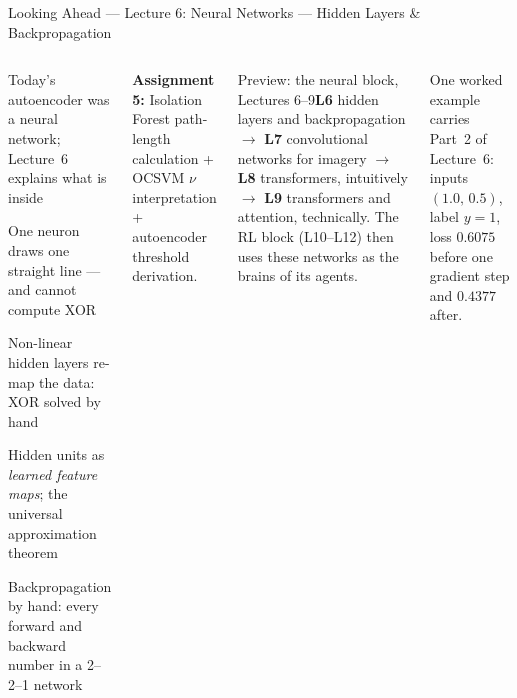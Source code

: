 \documentclass[aspectratio=169,10pt,t]{beamer}
\begin{document}
\begin{frame}{Looking Ahead --- Lecture 6: Neural Networks --- Hidden Layers \& Backpropagation}
\begin{columns}[T]
\begin{tl}\item Today's autoencoder was a neural network; Lecture~6 explains what is inside\item One neuron draws one straight line --- and cannot compute XOR\item Non-linear hidden layers re-map the data: XOR solved by hand\item Hidden units as \emph{learned feature maps}; the universal approximation theorem\item Backpropagation by hand: every forward and backward number in a 2--2--1 network\end{tl}
\begin{ibox}\scriptsize\textbf{Assignment 5:} Isolation Forest path-length calculation + OCSVM $\nu$ interpretation + autoencoder threshold derivation.\end{ibox}
\begin{cbox}{Preview: the neural block, Lectures 6--9}\scriptsize \textbf{L6} hidden layers and backpropagation $\to$ \textbf{L7} convolutional networks for imagery $\to$ \textbf{L8} transformers, intuitively $\to$ \textbf{L9} transformers and attention, technically. The RL block (L10--L12) then uses these networks as the brains of its agents.\end{cbox}
\begin{rbox}\scriptsize One worked example carries Part~2 of Lecture~6: inputs $(1.0,\,0.5)$, label $y=1$, loss $0.6075$ before one gradient step and $0.4377$ after.\end{rbox}
\end{columns}
\end{frame}
\end{document}
